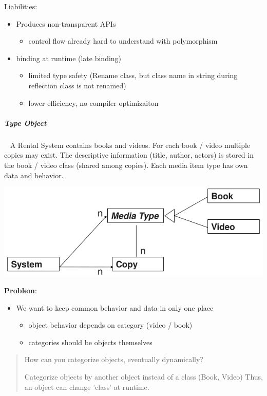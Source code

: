 \documentclass[11pt,twoside,landscape]{article}
\begin{document}
\begin{multicols}{3}
Liabilities:
\begin{itemize}
\item Produces non-transparent APIs
\begin{itemize}
\item control flow already hard to understand with polymorphism
\end{itemize}
\item binding at runtime (late binding)
\begin{itemize}
\item limited type safety (Rename class, but class name in string during reflection class is not renamed)
\item lower efficiency, no compiler-optimizaiton
\end{itemize}
\end{itemize}
\subparagraph{Type Object} \
\label{sec:orgc4b6b6f}
A Rental System contains books and videos.
For each book / video multiple copies may exist.
The descriptive information (title, author, actors) is stored in the book / video class (shared among copies).
Each media item type has own data and behavior.

{
\begin{center}
\includegraphics[width=.9\linewidth]{img/rental_system_example.png}
\end{center}
\label{fig:rental-system-example}
}
\textbf{Problem}:
\begin{itemize}
\item We want to keep common behavior and data in only one place
\begin{itemize}
\item object behavior depends on category (video / book)
\item categories should be objects themselves
\end{itemize}
\end{itemize}

\begin{quote}
How can you categorize objects, eventually dynamically?

Categorize objects by another object instead of a class (Book, Video)
Thus, an object can change 'class' at runtime.
\end{quote}



\end{multicols}
\end{document}

